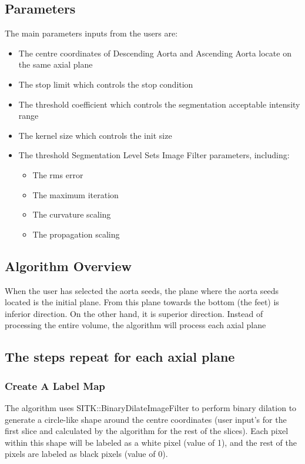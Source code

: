 \subsection{Parameters}
The main parameters inputs from the users are:
\begin{itemize}
\item The centre coordinates of Descending Aorta and Ascending Aorta locate on the same axial plane
\item The stop limit which controls the stop condition
\item The threshold coefficient which controls the segmentation acceptable intensity range
\item The kernel size which controls the init size 
\item The threshold Segmentation Level Sets Image Filter parameters, including:
\begin{itemize}
\item The rms error
\item The maximum iteration
\item The curvature scaling
\item The propagation scaling
\end{itemize}
\end{itemize}


\subsection{Algorithm Overview}

When the user has selected the aorta seeds, the plane where the aorta seeds located is the initial plane. From this plane towards the bottom (the feet) is inferior direction. On the other hand, it is superior direction. Instead of processing the entire volume, the algorithm will process each axial plane 

\subsection{The steps repeat for each axial plane}
\subsubsection{Create A Label Map}
The algorithm uses SITK::BinaryDilateImageFilter to perform binary dilation to generate a circle-like shape around the centre coordinates (user input’s for the first slice and calculated by the algorithm for the rest of the slices). Each pixel within this shape will be labeled as a white pixel (value of 1), and the rest of the pixels are labeled as black pixels (value of 0). 

